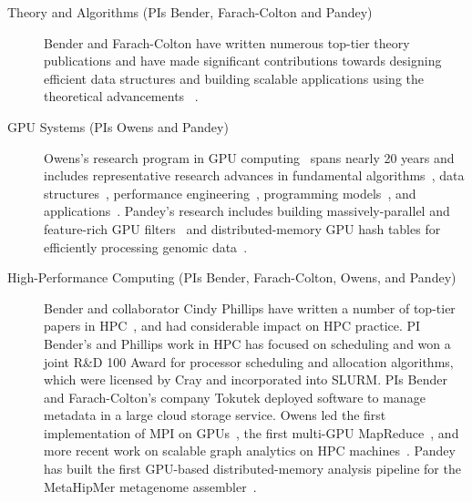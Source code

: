 \begin{description}
    \item[Theory and Algorithms (PIs Bender, Farach-Colton and Pandey)]
    Bender and Farach-Colton have written numerous top-tier  theory publications and have made significant contributions towards designing efficient data structures and building scalable applications using the theoretical advancements   ~\cite{BenderFaGo18,BenderFaJo12,BenderFaJo12a,PandeyBJ17,PandeyABFJP18Cell,PandeyBJP17a,PandeyBJP17b,conway2018optimal,JannenYuZh15a,JannenYuZh15b,YuanZhJa16,pandey2021terrace,pandey2021variantstore,pandey2022iceberght}.

    \item[GPU Systems (PIs Owens and Pandey)] Owens's research program in GPU computing~\cite{Owens:2007:ASO,Owens:2008:GC} spans nearly 20 years and includes representative research advances in fundamental algorithms~\cite{Sengupta:2007:SPF}, data structures~\cite{Lefohn:2006:GGE,Alcantara:2009:RPH}, %
    performance engineering~\cite{Zhang:2011:AQP}, programming models~\cite{Gupta:2012:ASO, Tzeng:2010:TMF}, and applications~\cite{Wang:2017:GGG}. Pandey's research includes building massively-parallel and feature-rich GPU filters~\cite{mccoy2022high} and distributed-memory GPU hash tables for efficiently processing genomic data~\cite{nisa2021distributed}.

    \item[High-Performance Computing (PIs Bender, Farach-Colton, Owens, and
        Pandey)] Bender and collaborator Cindy Phillips have
      written a number of top-tier  papers in HPC~\cite{PandeySMB20,bender2017two,eckstein2015pebbl,agrawal1989four,bender2008communication,greenberg1999enabling},
      and had considerable impact on HPC practice.
      PI Bender’s and Phillips work in HPC has focused on scheduling and  won a joint R\&D 100 Award for processor scheduling and allocation algorithms, which were licensed by Cray and incorporated into SLURM\@.  PIs Bender and Farach-Colton's company Tokutek deployed software to manage metadata in a large cloud storage service. Owens led the first implementation of MPI on GPUs~\cite{Stuart:2009:MPO:withouturl,Stuart:2011:EMT}, the first multi-GPU MapReduce~\cite{Stuart:2011:MMO}, and more recent work on scalable graph analytics on HPC machines~\cite{Pan:2018:SBS,Pan:2017:MGA,Chen:2022:SIP}. Pandey has built the first GPU-based distributed-memory \kmer analysis pipeline for the MetaHipMer metagenome assembler~\cite{nisa2021distributed}.


\end{description}
